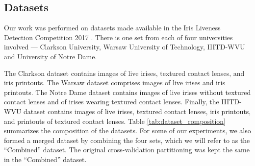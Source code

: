 \begin{table*}[!htbp]
\centering
\caption{Composition of the Datasets}
\label{tab:dataset_composition}
\end{table*}

\subsection{Datasets}
\label{sec:dataset}

Our work was performed on datasets made available in the Iris Liveness Detection Competition 2017 \cite{Yambay2017}. There is one set from each of four universities involved --- Clarkson University, Warsaw University of Technology, IIITD-WVU and University of Notre Dame.

The Clarkson dataset \cite{Yambay2014, Yambay2015, Yambay2017} contains images of live irises, textured contact lenses, and iris printouts. The Warsaw dataset \cite{Yambay2017} comprises images of live irises and iris printouts. 
The Notre Dame dataset \cite{Doyle2015} contains images of live irises without textured contact lenses and of irises wearing textured contact lenses. Finally, the IIITD-WVU dataset \cite{Kohli2013, Gupta2014, Yadav2014, Kohli2016} contains images of live irises, textured contact lenses, iris printouts, and printouts of textured contact lenses.
Table \ref{tab:dataset_composition} summarizes the composition of the datasets. For some of our experiments, we also formed a merged dataset by combining the four sets, which we will refer to as the ``Combined'' dataset. The original cross-validation partitioning was kept the same in the ``Combined'' dataset.

